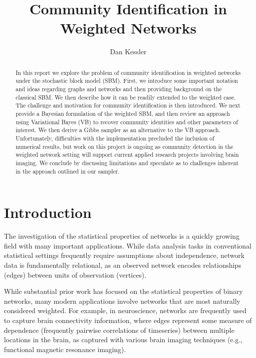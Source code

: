 \documentclass[11pt]{article}   %
\begin{document}


\title{Community Identification in Weighted Networks}
\author{Dan Kessler}

\maketitle

\begin{abstract}
  In this report we explore the problem of community identification in weighted networks under the stochastic block model (SBM).
  First, we introduce some important notation and ideas regarding graphs and networks and then providing background on the classical SBM.
  We then describe how it can be readily extended to the weighted case.
  The challenge and motivation for community identification is then introduced.
  We next provide a Bayesian formulation of the weighted SBM, and then review an approach using Variational Bayes (VB) to recover community identities and other parameters of interest.
  We then derive a Gibbs sampler as an alternative to the VB approach.
  Unfortunately, difficulties with the implementation precluded the inclusion of numerical results, but work on this project is ongoing as community detection in the weighted network setting will support current applied research projects involving brain imaging.
  We conclude by discussing limitations and speculate as to challenges inherent in the approach outlined in our sampler.
\end{abstract}

\section{Introduction}
\label{sec:introduction}

The investigation of the statistical properties of networks is a quickly growing field with many important applications.
While data analysis tasks in conventional statistical settings frequently require assumptions about independence, network data is fundamentally relational, as an observed network encodes relationships (edges) between units of observation (vertices).

While substantial prior work has focused on the statistical properties of binary networks, many modern applications involve networks that are most naturally considered weighted.
For example, in neuroscience, networks are frequently used to capture brain connectivity information, where edges represent some measure of dependence (frequently pairwise correlations of timeseries) between multiple locations in the brain, as captured with various brain imaging techniques (e.g., functional magnetic resonance imaging).
\end{document}
